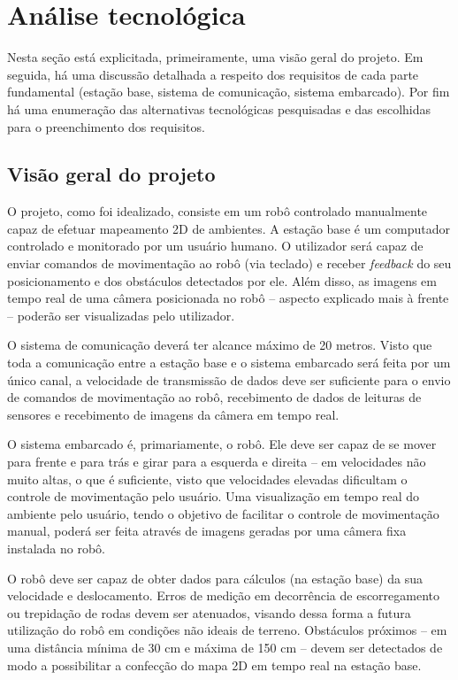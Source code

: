 \chapter{Análise tecnológica}
Nesta seção está explicitada, primeiramente, uma visão geral do projeto. Em seguida, há uma discussão detalhada a respeito dos requisitos de cada parte fundamental (estação base, sistema de comunicação, sistema embarcado). Por fim há uma enumeração das alternativas tecnológicas pesquisadas e das escolhidas para o preenchimento dos requisitos.

\section{Visão geral do projeto}

O projeto, como foi idealizado, consiste em um robô controlado manualmente capaz de efetuar mapeamento 2D de ambientes. A estação base é um computador controlado e monitorado por um usuário humano. O utilizador será capaz de enviar comandos de movimentação ao robô (via teclado) e receber \textit{feedback} do seu posicionamento e dos obstáculos detectados por ele. Além disso, as imagens em tempo real de uma câmera posicionada no robô -- aspecto explicado mais à frente -- poderão ser visualizadas pelo utilizador.

O sistema de comunicação deverá ter alcance máximo de 20 metros. Visto que toda a comunicação entre a estação base e o sistema embarcado será feita por um único canal, a velocidade de transmissão de dados deve ser suficiente para o envio de comandos de movimentação ao robô, recebimento de dados de leituras de sensores e recebimento de imagens da câmera em tempo real.

O sistema embarcado é, primariamente, o robô. Ele deve ser capaz de se mover para frente e para trás e girar para a esquerda e direita -- em velocidades não muito altas, o que é suficiente, visto que velocidades elevadas dificultam o controle de movimentação pelo usuário. Uma visualização em tempo real do ambiente pelo usuário, tendo o objetivo de facilitar o controle de movimentação manual, poderá ser feita através de imagens geradas por uma câmera fixa instalada no robô. 

O robô deve ser capaz de obter dados para cálculos (na estação base) da sua velocidade e deslocamento. Erros de medição em decorrência de escorregamento ou trepidação de rodas devem ser atenuados, visando dessa forma a futura utilização do robô em condições não ideais de terreno. Obstáculos próximos -- em uma distância mínima de 30 cm e máxima de 150 cm -- devem ser detectados de modo a possibilitar a confecção do mapa 2D em tempo real na estação base.


